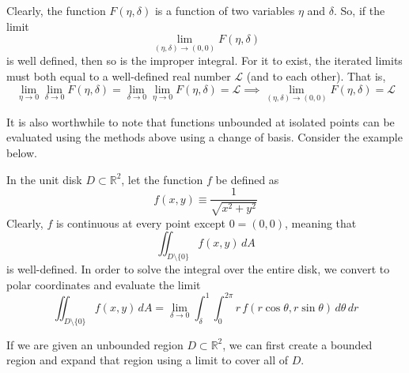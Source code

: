   Clearly, the function $F( \eta, \delta)$ is a function of two variables $\eta$ and $\delta$. So, if the limit 
  \[\lim_{(\eta, \delta) \rightarrow (0, 0)} F(\eta, \delta)\]
  is well defined, then so is the improper integral. For it to exist, the iterated limits must both equal to a well-defined real number $\mathcal{L}$ (and to each other). That is, 
  \[\lim_{\eta \rightarrow 0} \lim_{\delta \rightarrow 0} F(\eta, \delta) = \lim_{\delta \rightarrow 0} \lim_{\eta \rightarrow 0} F(\eta, \delta) = \mathcal{L} \implies \lim_{(\eta, \delta) \rightarrow (0,0)} F(\eta, \delta) = \mathcal{L}\]


  It is also worthwhile to note that functions unbounded at isolated points can be evaluated using the methods above using a change of basis. Consider the example below. 

  \begin{example}
  In the unit disk $D \subset \mathbb{R}^2$, let the function $f$ be defined as 
  \[f(x, y) \equiv \frac{1}{\sqrt{x^2 + y^2} }\]
  Clearly, $f$ is continuous at every point except $0= (0,0)$, meaning that 
  \[\iint_{D \setminus \{0\}} f(x, y)\, dA\]
  is well-defined. In order to solve the integral over the entire disk, we convert to polar coordinates and evaluate the limit
  \[\iint_{D \setminus \{0\}} f(x, y) \, dA = \lim_{\delta \rightarrow 0} \int_{\delta}^1 \int_0^{2 \pi} r \, f( r \cos{\theta}, r \sin{\theta}) \, d\theta \,dr\]
  \end{example}
  \begin{center}
  \end{center}

  If we are given an unbounded region $D \subset \mathbb{R}^2$, we can first create a bounded region and expand that region using a limit to cover all of $D$. 


